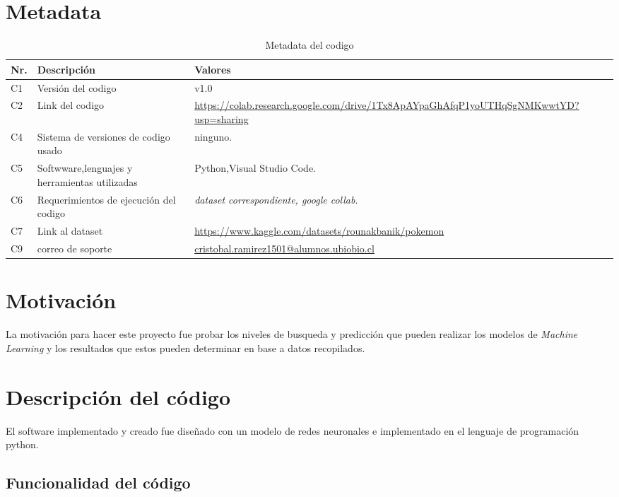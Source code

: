 \documentclass[]{elsarticle}
\begin{document}

\section*{Metadata}


\begin{table}[!h]
\begin{tabular}{|l|p{6.5cm}|p{6.5cm}|}
\hline
\textbf{Nr.} & \textbf{Descripción} & \textbf{Valores} \\
\hline
C1 &Versión del codigo & v1.0 \\
\hline
C2 & Link del codigo & \url{https://colab.research.google.com/drive/1Tx8ApAYpaGhAfqP1yoUTHqSgNMKwwtYD?usp=sharing} \\
\hline
C4 & Sistema de versiones de codigo usado & ninguno. \\
\hline
    C5 & Softwware,lenguajes y herramientas utilizadas & Python,Visual Studio Code. \\
\hline
C6 & Requerimientos de ejecución del codigo & \textit{dataset correspondiente, google collab}.\\
\hline
C7 & Link al dataset & \url{https://www.kaggle.com/datasets/rounakbanik/pokemon} \\
\hline
C9 & correo de soporte & \url{cristobal.ramirez1501@alumnos.ubiobio.cl}\\
\hline
\end{tabular}
\caption{Metadata del codigo}
\label{codeMetadata} 
\end{table}






\section{Motivación}
La motivación para hacer este proyecto fue probar los niveles de busqueda y predicción que pueden realizar los modelos de \textit{Machine Learning} y los resultados que estos pueden determinar en base a datos recopilados.

\section{Descripción del código}

El software implementado y creado fue diseñado con un modelo de redes neuronales  e implementado en el lenguaje de programación python.


 \subsection{Funcionalidad del código}
\end{document}

